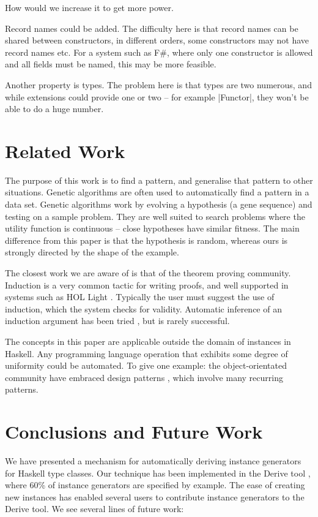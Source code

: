 \documentclass[preprint,draft]{sigplanconf}
\begin{document}
How would we increase it to get more power.

Record names could be added. The difficulty here is that record names can be shared between constructors, in different orders, some constructors may not have record names etc. For a system such as F\#, where only one constructor is allowed and all fields must be named, this may be more feasible.

Another property is types. The problem here is that types are two numerous, and while extensions could provide one or two -- for example |Functor|, they won't be able to do a huge number.

\section{Related Work}
\label{sec:related}

The purpose of this work is to find a pattern, and generalise that pattern to other situations. Genetic algorithms \cite{genetic_algorithms} are often used to automatically find a pattern in a data set. Genetic algorithms work by evolving a hypothesis (a gene sequence) and testing on a sample problem. They are well suited to search problems where the utility function is continuous -- close hypotheses have similar fitness. The main difference from this paper is that the hypothesis is random, whereas ours is strongly directed by the shape of the example.

The closest work we are aware of is that of the theorem proving community. Induction is a very common tactic for writing proofs, and well supported in systems such as HOL Light \cite{hol_light}. Typically the user must suggest the use of induction, which the system checks for validity. Automatic inference of an induction argument has been tried \cite{mintchev:reasoning}, but is rarely successful.

The concepts in this paper are applicable outside the domain of instances in Haskell. Any programming language operation that exhibits some degree of uniformity could be automated. To give one example: the object-orientated community have embraced design patterns \cite{design_patterns}, which involve many recurring patterns.

\section{Conclusions and Future Work}
\label{sec:conclusion}

We have presented a mechanism for automatically deriving instance generators for Haskell type classes. Our technique has been implemented in the Derive tool \cite{derive}, where 60\% of instance generators are specified by example. The ease of creating new instances has enabled several users to contribute instance generators to the Derive tool. We see several lines of future work:
\end{document}
